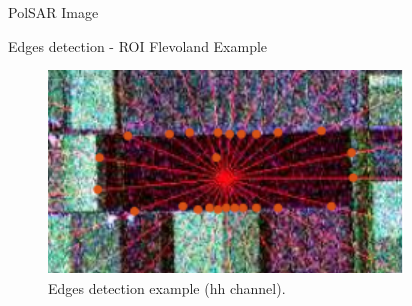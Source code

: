 \documentclass[10pt]{beamer}
\begin{document}
\begin{frame}[fragile]{PolSAR Image}
\begin{alertblock}{Edges detection - ROI Flevoland Example} 
\begin{figure}[hbt]
\centering
	\includegraphics[width=.7\linewidth]{flevoland_radial_25_point_hh_crop}
	\caption{Edges detection example ($\text{hh}$ channel).}
\label{flevoland_radial_4look}
\end{figure}
\end{alertblock}
\end{frame}

\end{document}
